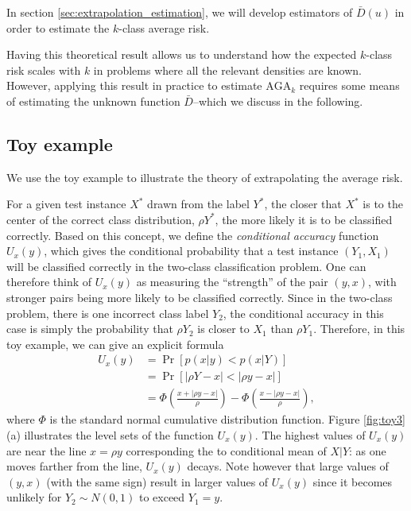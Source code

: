 \documentclass[12pt]{article}
\begin{document}
In section \ref{sec:extrapolation_estimation}, we will develop
estimators of $\bar{D}(u)$ in order to estimate the $k$-class average
risk.

Having this theoretical result allows us to understand how the
expected $k$-class risk scales with $k$ in problems where all the
relevant densities are known.  However, applying this result in
practice to estimate $\text{AGA}_k$ requires some means of
estimating the unknown function $\bar{D}$--which we discuss in the
following.


\subsection{Toy example}

We use the toy example to illustrate the theory of extrapolating the average
risk.



For a given test instance $X^*$ drawn from the label $Y^*$, the closer
that $X^*$ is to the center of the correct class distribution, $\rho
Y^*$, the more likely it is to be classified correctly.  Based on this
concept, we define the \emph{conditional accuracy} function $U_x(y)$,
which gives the conditional probability that a test instance $(Y_1,
X_1)$ will be classified correctly in the two-class classification
problem.  One can therefore think of $U_x(y)$ as measuring the
``strength'' of the pair $(y, x)$, with stronger pairs being more
likely to be classified correctly.  Since in the two-class problem,
there is one incorrect class label $Y_2$, the conditional accuracy in
this case is simply the probability that $\rho Y_2$ is closer to $X_1$
than $\rho Y_1$.  Therefore, in this toy example, we can give an
explicit formula
\begin{align*}
U_x(y) &= \Pr[p(x|y) < p(x|Y)]
\\&= \Pr[|\rho Y - x|< |\rho y - x|] 
\\&= \Phi\left(\frac{x + |\rho y - x|}{\rho}\right) - \Phi\left(\frac{x - |\rho y - x|}{\rho}\right),
\end{align*}
where $\Phi$ is the standard normal cumulative distribution function.
Figure \ref{fig:toy3}(a) illustrates the level sets of the function
$U_x(y)$.  The highest values of $U_x(y)$ are near the line $x = \rho
y$ corresponding the to conditional mean of $X|Y$: as one moves
farther from the line, $U_x(y)$ decays.  Note however that large
values of $(y, x)$ (with the same sign) result in larger values of
$U_x(y)$ since it becomes unlikely for $Y_2 \sim N(0,1)$ to exceed
$Y_1 = y$.
\end{document}
